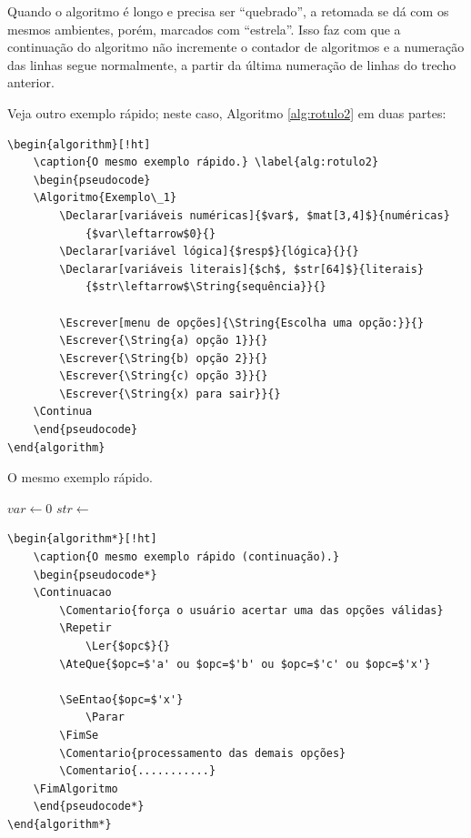 \documentclass[a4paper,12pt,oneside,onecolumn,final,fleqn]{repUERJ}
\begin{document}
Quando o algoritmo é longo e precisa ser ``quebrado'', a retomada se dá com os mesmos ambientes, porém, marcados com ``estrela''. Isso faz com que a continuação do algoritmo não incremente o contador de algoritmos e a numeração das linhas segue normalmente, a partir da última numeração de linhas do trecho anterior.

Veja outro exemplo rápido; neste caso, Algoritmo \ref{alg:rotulo2} em duas partes:
\begin{verbatim}
\begin{algorithm}[!ht]
    \caption{O mesmo exemplo rápido.} \label{alg:rotulo2}
    \begin{pseudocode}
    \Algoritmo{Exemplo\_1}
        \Declarar[variáveis numéricas]{$var$, $mat[3,4]$}{numéricas}
            {$var\leftarrow$0}{}
        \Declarar[variável lógica]{$resp$}{lógica}{}{}
        \Declarar[variáveis literais]{$ch$, $str[64]$}{literais}
            {$str\leftarrow$\String{sequência}}{}
        
        \Escrever[menu de opções]{\String{Escolha uma opção:}}{}
        \Escrever{\String{a) opção 1}}{}
        \Escrever{\String{b) opção 2}}{}
        \Escrever{\String{c) opção 3}}{}
        \Escrever{\String{x) para sair}}{}
    \Continua
    \end{pseudocode}
\end{algorithm}
\end{verbatim}

\begin{algorithm}[!ht]
    \caption{O mesmo exemplo rápido.} \label{alg:rotulo2}
    \begin{pseudocode}
            {$var\leftarrow$0}{}
            {$str\leftarrow$}{}
        
    \Continua
    \end{pseudocode}
\end{algorithm}

\begin{verbatim}
\begin{algorithm*}[!ht]
    \caption{O mesmo exemplo rápido (continuação).}
    \begin{pseudocode*}
    \Continuacao
        \Comentario{força o usuário acertar uma das opções válidas}
        \Repetir
            \Ler{$opc$}{}
        \AteQue{$opc=$'a' ou $opc=$'b' ou $opc=$'c' ou $opc=$'x'}
        
        \SeEntao{$opc=$'x'}
            \Parar
        \FimSe
        \Comentario{processamento das demais opções}
        \Comentario{...........}
    \FimAlgoritmo
    \end{pseudocode*}
\end{algorithm*}
\end{verbatim}
\end{document}
